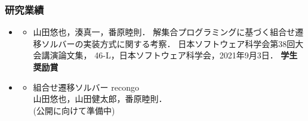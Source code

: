 \documentclass[dvipdfmx,11pt]{beamer}
\begin{document}
\begin{frame}\frametitle{研究業績}
  \begin{itemize}
  \item {}
    \begin{itemize}
    \item 山田悠也，湊真一，番原睦則．
      解集合プログラミングに基づく組合せ遷移ソルバーの実装方式に関する考察．
      日本ソフトウェア科学会第38回大会講演論文集，
      46-L，日本ソフトウェア科学会，2021年9月3日．
      \alert{\bf 学生奨励賞}
    \end{itemize}
    \item {}
    \begin{itemize}
    \item 組合せ遷移ソルバー recongo\\
      山田悠也，山田健太郎，番原睦則．\\
      (公開に向けて準備中)
    \end{itemize}
  \end{itemize}
\end{frame}

\end{document}
